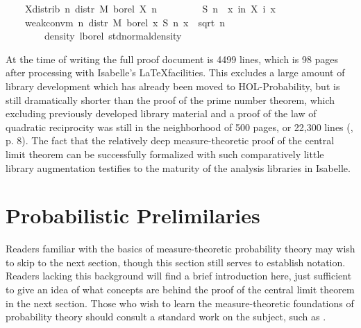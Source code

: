 \documentclass{article}
\theoremstyle{definition}
\begin{document}
\begin{isabellebody}
\ \ \ \ X{\isacharunderscore}distrib{\isacharcolon}\ {\isachardoublequoteopen}{\isasymAnd}n{\isachardot}\ distr\ M\ borel\ {\isacharparenleft}X\ n{\isacharparenright}\ {\isacharequal}\ {\isasymmu}{\isachardoublequoteclose}\isanewline
\ \ \isanewline
\ \ \ \ {\isachardoublequoteopen}S\ n\ {\isasymequiv}\ {\isasymlambda}x{\isachardot}\ {\isasymSum}i{\isacharless}n{\isachardot}\ X\ i\ x{\isachardoublequoteclose}\isanewline
\ \ \isanewline
\ \ \ \ {\isachardoublequoteopen}weak{\isacharunderscore}conv{\isacharunderscore}m\ {\isacharparenleft}{\isasymlambda}n{\isachardot}\ distr\ M\ borel\ {\isacharparenleft}{\isasymlambda}x{\isachardot}\ S\ n\ x\ {\isacharslash}\ sqrt\ {\isacharparenleft}n\ {\isacharasterisk}\ {\isasymsigma}\ \isanewline
\ \ \ \ \ \ \ \ {\isacharparenleft}density\ lborel\ std{\isacharunderscore}normal{\isacharunderscore}density{\isacharparenright}{\isachardoublequoteclose}
\end{isabellebody}

\medskip

At the time of writing the full proof document is 4499 lines, which is 98 pages after processing with Isabelle's \LaTeX facilities. This excludes a large amount of library development which has already been moved to HOL-Probability, but is still dramatically shorter than the proof of the prime number theorem, which excluding previously developed library material and a proof of the law of quadratic reciprocity was still in the neighborhood of 500 pages, or 22,300 lines (\cite{avigad-etal-pnt}, p. 8). The fact that the relatively deep measure-theoretic proof of the central limit theorem can be successfully formalized with such comparatively little library augmentation testifies to the maturity of the analysis libraries in Isabelle.

\section{Probabilistic Prelimilaries}

Readers familiar with the basics of measure-theoretic probability theory may wish to skip to the next section, though this section still serves to establish notation. Readers lacking this background will find a brief introduction here, just sufficient to give an idea of what concepts are behind the proof of the central limit theorem in the next section. Those who wish to learn the measure-theoretic foundations of probability theory should consult a standard work on the subject, such as \cite{billingsley}.
\end{document}
